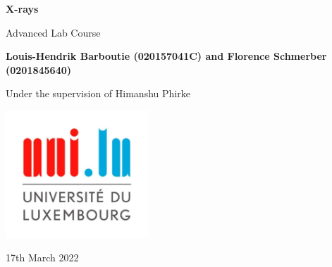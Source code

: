 \documentclass{scrartcl}
\begin{document}
\begin{titlepage}
    \begin{center}
        \vspace*{1cm}
        \Huge
        \textbf{X-rays}
        
        \vspace{0.5cm}
        \LARGE
        Advanced Lab Course
        
        \vspace{1.5cm}
        \textbf{Louis-Hendrik Barboutie (020157041C) and Florence Schmerber (0201845640)}
        
        \vspace{1cm}
        Under the supervision of Himanshu Phirke
        \vfill
        

        \includegraphics[width=0.4\textwidth]{logo_uni.jpg}
        
        \Large
        17th March 2022
    \end{center}
\end{titlepage}

\clearpage

\tableofcontents

\listoffigures
	
\clearpage
\end{document}
